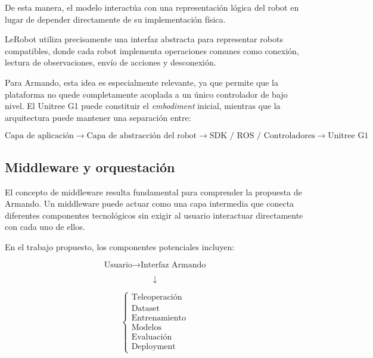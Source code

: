 \documentclass[stu,12pt,floatsintext]{apa7}
\begin{document}
De esta manera, el modelo interactúa con una representación lógica del robot en lugar de depender directamente de su implementación física.

LeRobot utiliza precisamente una interfaz abstracta para representar robots compatibles, donde cada robot implementa operaciones comunes como conexión, lectura de observaciones, envío de acciones y desconexión.

Para Armando, esta idea es especialmente relevante, ya que permite que la plataforma no quede completamente acoplada a un único controlador de bajo nivel. El Unitree G1 puede constituir el \textit{embodiment} inicial, mientras que la arquitectura puede mantener una separación entre:

\begin{equation}
\text{Capa de aplicación}
\rightarrow
\text{Capa de abstracción del robot}
\rightarrow
\text{SDK / ROS / Controladores}
\rightarrow
\text{Unitree G1}
\end{equation}

\subsection{Middleware y orquestación}

El concepto de middleware resulta fundamental para comprender la propuesta de Armando. Un middleware puede actuar como una capa intermedia que conecta diferentes componentes tecnológicos sin exigir al usuario interactuar directamente con cada uno de ellos.

En el trabajo propuesto, los componentes potenciales incluyen:

\begin{equation}
\text{Usuario}
\rightarrow
\text{Interfaz Armando}
\end{equation}

\begin{equation}
\downarrow
\end{equation}

\begin{equation}
\begin{cases}
\text{Teleoperación}\\
\text{Dataset}\\
\text{Entrenamiento}\\
\text{Modelos}\\
\text{Evaluación}\\
\text{Deployment}
\end{cases}
\end{equation}
\end{document}
